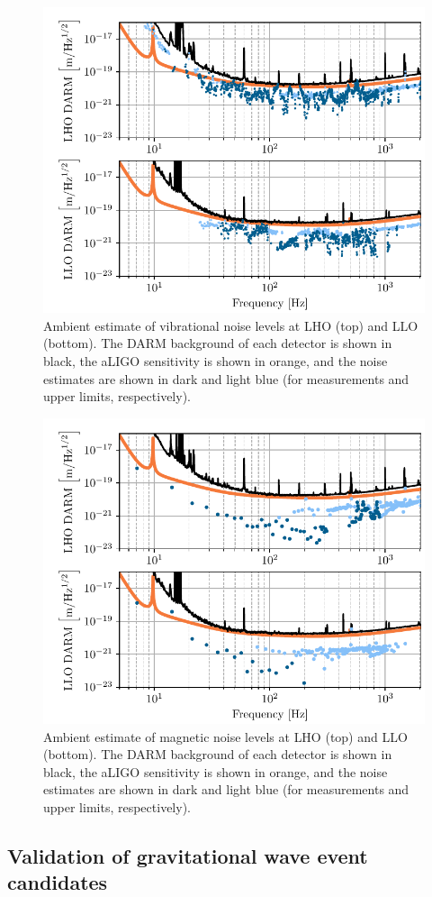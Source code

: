 \begin{figure}
	\centering
	\includegraphics[width=\textwidth]{figures/ambient_vib.pdf}
	\caption{Ambient estimate of vibrational noise levels at \ac{LHO} (top) and \ac{LLO} (bottom). The \ac{DARM} background of each detector is shown in black, the \ac{aLIGO} sensitivity is shown in orange, and the noise estimates are shown in dark and light blue (for measurements and upper limits, respectively).}
	\label{fig:ambient_vib}
\end{figure}

\begin{figure}
\centering
\includegraphics[width=\textwidth]{figures/ambient_mag.pdf}
\caption{Ambient estimate of magnetic noise levels at \ac{LHO} (top) and \ac{LLO} (bottom). The \ac{DARM} background of each detector is shown in black, the \ac{aLIGO} sensitivity is shown in orange, and the noise estimates are shown in dark and light blue (for measurements and upper limits, respectively).}
\label{fig:ambient_mag}
\end{figure}

\subsection{Validation of gravitational wave event candidates}\label{subsec:vetting}
